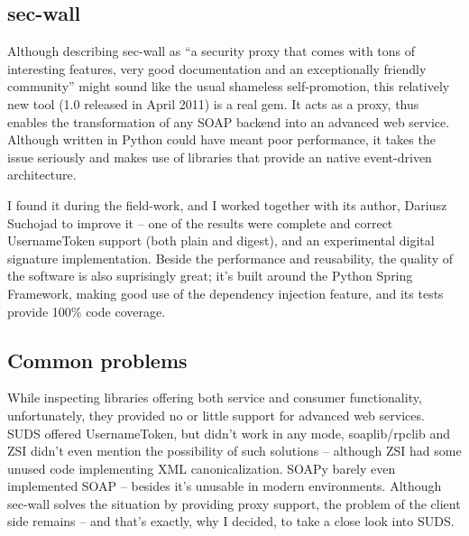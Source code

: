 \subsection{sec-wall}

Although \cite{sec-wall-homepage} describing sec-wall as ``a security proxy that comes with tons of interesting features, very good documentation and an exceptionally friendly community'' might sound like the usual shameless self-promotion, this relatively new tool (1.0 released in April 2011) is a real gem. It acts as a proxy, thus enables the transformation of any SOAP backend into an advanced web service. Although written in Python could have meant poor performance, it takes the issue seriously and makes use of libraries that provide an native event-driven architecture.

I found it during the field-work, and I worked together with its author, Dariusz Suchojad to improve it -- one of the results were complete and correct UsernameToken support (both plain and digest), and an experimental digital signature implementation. Beside the performance and reusability, the quality of the software is also suprisingly great; it's built around the Python Spring Framework, making good use of the dependency injection feature, and its tests provide 100\% code coverage.

\subsection{Common problems}

While inspecting libraries offering both service and consumer functionality, unfortunately, they provided no or little support for advanced web services. SUDS offered UsernameToken, but didn't work in any mode, soaplib/rpclib and ZSI didn't even mention the possibility of such solutions -- although ZSI had some unused code implementing XML canonicalization. SOAPy barely even implemented SOAP -- besides it's unusable in modern environments. Although sec-wall solves the situation by providing proxy support, the problem of the client side remains -- and that's exactly, why I decided, to take a close look into SUDS.
